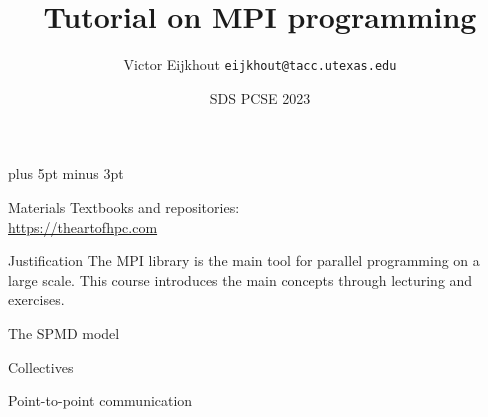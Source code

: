 \documentclass[11pt,headernav]{beamer}
\def\Location{}%
\def\courseyear{2023}
\def\Location{SDS PCSE \courseyear}
\newcounter{tacc}
\def\TitleExtra{}
\begin{document}
\parskip=10pt plus 5pt minus 3pt

\title{Tutorial on MPI programming\TitleExtra}
\author{Victor Eijkhout {\tt eijkhout@tacc.utexas.edu}}
\date{\Location}

\begin{frame}
  \titlepage
\end{frame}

\begin{xsede}
  
\end{xsede}

\begin{frame}[containsverbatim]{Materials}
    Textbooks and repositories:\\
    \url{https://theartofhpc.com}
\end{frame}

\begin{frame}{Justification}
  The MPI library is the main tool
  for parallel programming on a large scale.
  This course introduces the main concepts
  through lecturing and exercises.
\end{frame}



\renewcommand\standardversion{3}

 {The SPMD model}


 {Collectives}


 {Point-to-point communication}


\iffalse
\begin{exerciseframe}[serialsend]
  
\end{exerciseframe}
\fi
\end{document}
